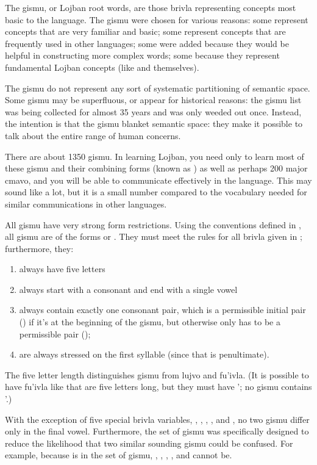 The gismu, or Lojban root words, are those brivla representing concepts most basic to the language. The gismu were chosen for various reasons: some represent concepts that are very familiar and basic; some represent concepts that are frequently used in other languages; some were added because they would be helpful in constructing more complex words; some because they represent fundamental Lojban concepts (like  and  themselves).

The gismu do not represent any sort of systematic partitioning of semantic space. Some gismu may be superfluous, or appear for historical reasons: the gismu list was being collected for almost 35 years and was only weeded out once. Instead, the intention is that the gismu blanket semantic space: they make it possible to talk about the entire range of human concerns.

There are about 1350 gismu. In learning Lojban, you need only to learn most of these gismu and their combining forms (known as ) as well as perhaps 200 major cmavo, and you will be able to communicate effectively in the language. This may sound like a lot, but it is a small number compared to the vocabulary needed for similar communications in other languages.

All gismu have very strong form restrictions. Using the conventions defined in , all gismu are of the forms  or . They must meet the rules for all brivla given in ; furthermore, they:
\begin{enumerate}
\item always have five letters
\item always start with a consonant and end with a single vowel
\item always contain exactly one consonant pair, which is a permissible initial pair () if it's at the beginning of the gismu, but otherwise only has to be a permissible pair ();
\item are always stressed on the first syllable (since that is penultimate).
\end{enumerate}

The five letter length distinguishes gismu from lujvo and fu'ivla. (It is possible to have fu'ivla like  that are five letters long, but they must have \q{}'; no gismu contains \q{}'.) 

With the exception of five special brivla variables, , , , , and , no two gismu differ only in the final vowel. Furthermore, the set of gismu was specifically designed to reduce the likelihood that two similar sounding gismu could be confused. For example, because  is in the set of gismu, , , , , and  cannot be.

